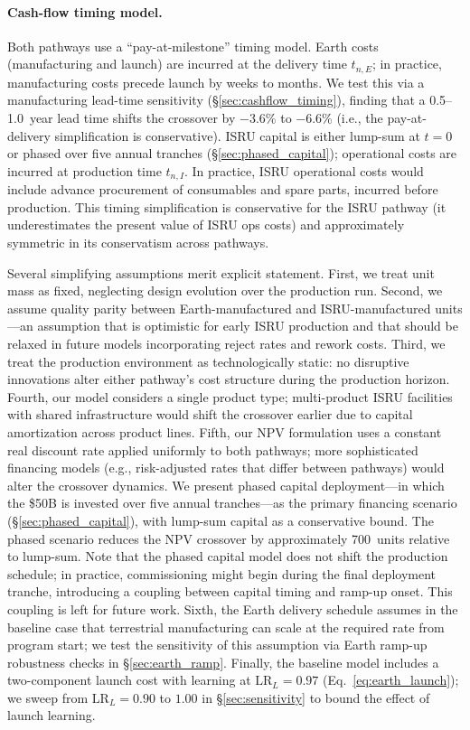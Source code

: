 \documentclass[preprint,12pt]{elsarticle}
\begin{document}
\paragraph{Cash-flow timing model.} Both pathways use a ``pay-at-milestone'' timing model. Earth costs (manufacturing and launch) are incurred at the delivery time $t_{n,E}$; in practice, manufacturing costs precede launch by weeks to months. We test this via a manufacturing lead-time sensitivity (\S\ref{sec:cashflow_timing}), finding that a 0.5--1.0~year lead time shifts the crossover by $-$3.6\% to $-$6.6\% (i.e., the pay-at-delivery simplification is conservative). ISRU capital is either lump-sum at $t = 0$ or phased over five annual tranches (\S\ref{sec:phased_capital}); operational costs are incurred at production time $t_{n,I}$. In practice, ISRU operational costs would include advance procurement of consumables and spare parts, incurred before production. This timing simplification is conservative for the ISRU pathway (it underestimates the present value of ISRU ops costs) and approximately symmetric in its conservatism across pathways.

Several simplifying assumptions merit explicit statement. First, we treat unit mass as fixed, neglecting design evolution over the production run. Second, we assume quality parity between Earth-manufactured and ISRU-manufactured units---an assumption that is optimistic for early ISRU production and that should be relaxed in future models incorporating reject rates and rework costs. Third, we treat the production environment as technologically static: no disruptive innovations alter either pathway's cost structure during the production horizon. Fourth, our model considers a single product type; multi-product ISRU facilities with shared infrastructure would shift the crossover earlier due to capital amortization across product lines. Fifth, our NPV formulation uses a constant real discount rate applied uniformly to both pathways; more sophisticated financing models (e.g., risk-adjusted rates that differ between pathways) would alter the crossover dynamics. We present phased capital deployment---in which the \$50B is invested over five annual tranches---as the primary financing scenario (\S\ref{sec:phased_capital}), with lump-sum capital as a conservative bound. The phased scenario reduces the NPV crossover by approximately 700~units relative to lump-sum. Note that the phased capital model does not shift the production schedule; in practice, commissioning might begin during the final deployment tranche, introducing a coupling between capital timing and ramp-up onset. This coupling is left for future work. Sixth, the Earth delivery schedule assumes in the baseline case that terrestrial manufacturing can scale at the required rate from program start; we test the sensitivity of this assumption via Earth ramp-up robustness checks in \S\ref{sec:earth_ramp}. Finally, the baseline model includes a two-component launch cost with learning at $\mathrm{LR}_L = 0.97$ (Eq.~\ref{eq:earth_launch}); we sweep from $\mathrm{LR}_L = 0.90$ to $1.00$ in \S\ref{sec:sensitivity} to bound the effect of launch learning.
\end{document}
